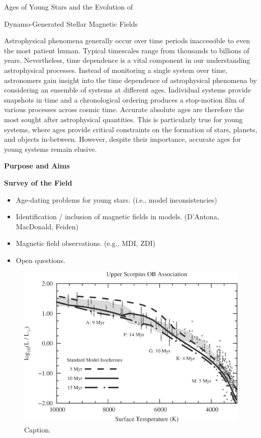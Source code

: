 \documentclass[12pt,a4paper]{article}
\begin{document}
\begin{center}
	{\bf {\LARGE Ages of Young Stars and the Evolution of 
	
	Dynamo-Generated Stellar Magnetic Fields}} 
\end{center}

Astrophysical phenomena generally occur over time periods inaccessible to even the most patient human. Typical timescales range from thousands to billions of years. Nevertheless, time dependence is a vital component in our understanding astrophysical processes. 
Instead of monitoring a single system over time, astronomers gain insight into the time dependence of astrophysical phenomena by considering an ensemble of systems at different ages. Individual systems provide snapshots in time and a chronological ordering produces a stop-motion film of various processes across cosmic time. Accurate absolute ages are therefore the most sought after astrophysical quantities. This is particularly true for young systems, where ages provide critical constraints on the formation of stars, planets, and objects in-between. However, despite their importance, accurate ages for young systems remain elusive.

\vspace{\baselineskip}

{\bf \large Purpose and Aims}

\clearpage

{\bf \large Survey of the Field}
\begin{itemize}
	\item Age-dating problems for young stars. (i.e., model inconsistencies)
	\item Identification / inclusion of magnetic fields in models. (D'Antona, MacDonald, Feiden)
	\item Magnetic field observations. (e.g., MDI, ZDI)
	\item Open questions.
\end{itemize}

\begin{figure}
	\centering
	\includegraphics[width=0.75\linewidth]{./fig/USco_Age_Problems.eps}
	\caption{Caption.}
	\label{fig:probs}
\end{figure}
\end{document}
